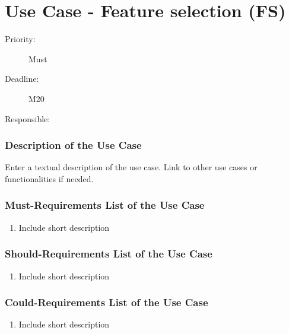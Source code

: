 \newpage
\section{Use Case - Feature selection (FS)}
\label{UseCase:FS}

\begin{description}
\item[Priority:] Must
\item[Deadline:] M20
\item[Responsible:]
\end{description}

\subsubsection*{Description of the Use Case}

Enter a textual description of the use case. Link to other use cases or functionalities if needed. 


\subsubsection*{Must-Requirements List of the Use Case}

\begin{enumerate}
\item Include short description
\end{enumerate}

\subsubsection*{Should-Requirements List of the Use Case}

\begin{enumerate}
\item Include short description
\end{enumerate}

\subsubsection*{Could-Requirements List of the Use Case}

\begin{enumerate}
\item Include short description
\end{enumerate}


